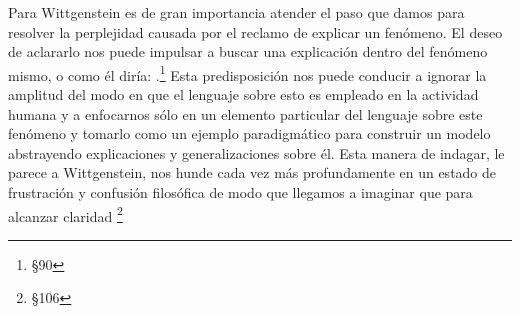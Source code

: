         Para Wittgenstein es de gran importancia atender el paso que damos para
        resolver la perplejidad causada por el reclamo de explicar un fenómeno. El
        deseo de aclararlo nos puede impulsar a buscar una explicación dentro del
        fenómeno mismo, o como él diría: .\footnote{\S90} Esta predisposición nos puede conducir
        a ignorar la amplitud del modo en que el lenguaje sobre esto es empleado en la
        actividad humana y a enfocarnos sólo en un elemento particular del lenguaje
        sobre este fenómeno y tomarlo como un ejemplo paradigmático para construir un
        modelo abstrayendo explicaciones y generalizaciones sobre él. Esta manera de
        indagar, le parece a Wittgenstein, nos hunde cada vez más profundamente en un
        estado de frustración y confusión filosófica de modo que llegamos a imaginar
        que para alcanzar claridad \footnote{\S106}

